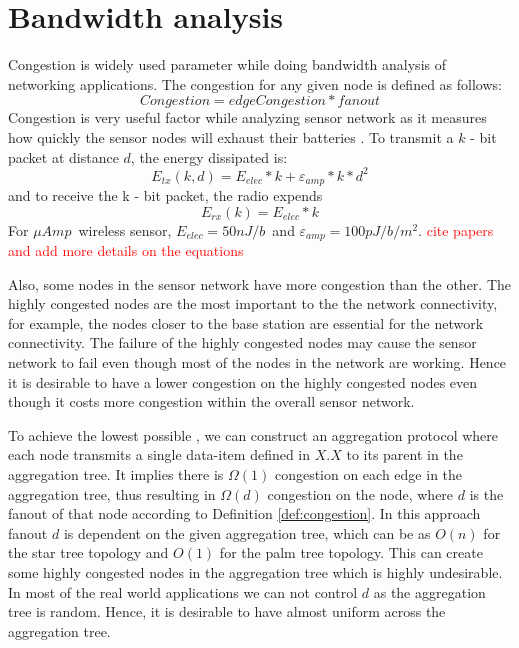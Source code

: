 \section{Bandwidth analysis}
	Congestion is widely used parameter while doing bandwidth analysis of networking applications. 
	The congestion for any given node is defined as follows:
	\begin{equation}\label{def:congestion}
		Congestion = edgeCongestion * fanout
	\end{equation}
	Congestion is very useful factor while analyzing sensor network as it measures how quickly the sensor nodes will exhaust their batteries \cite{madden2003design}. 
	To transmit a $k$ - bit packet at distance $d$, the energy dissipated is:
	\begin{equation}
		E_{tx}(k, d) = E_{elec} * k + \varepsilon_{amp} * k * d^{2}
	\end{equation}
	and to receive the k - bit packet, the radio expends
	\begin{equation}
		E_{rx}(k) = E_{elec} * k
	\end{equation}
	For $\mu Amp$\ wireless sensor, $E_{elec} = 50nJ/b$\ and $\varepsilon_{amp} = 100pJ/b/m^2$. \textcolor{red}{cite papers and add more details on the equations}

	Also, some nodes in the sensor network have more congestion than the other. 
	The highly congested nodes are the most important to the the network connectivity, for example, the nodes closer to the base station are essential for the network connectivity.
	The failure of the highly congested nodes may cause the sensor network to fail even though most of the nodes in the network are working.
	Hence it is desirable to have a lower congestion on the highly congested nodes even though it costs more congestion within the overall sensor network. 

	To achieve the lowest possible \informationRate, we can construct an aggregation protocol where each node transmits a single data-item defined in $X.X$ to its parent in the aggregation tree.
	It implies there is $\Omega(1)$ congestion on each edge in the aggregation tree, thus resulting in $\Omega(d)$ congestion on the node, where $d$ is the fanout of that node according to Definition \ref{def:congestion}.
	In this approach fanout $d$ is dependent on the given aggregation tree, which can be as $O(n)$ for the star tree topology and $O(1)$ for the palm tree topology.
	This can create some highly congested nodes in the aggregation tree which is highly undesirable.
	In most of the real world applications we can not control $d$ as the aggregation tree is random.
	Hence, it is desirable to have almost uniform \informationRate across the aggregation tree.

